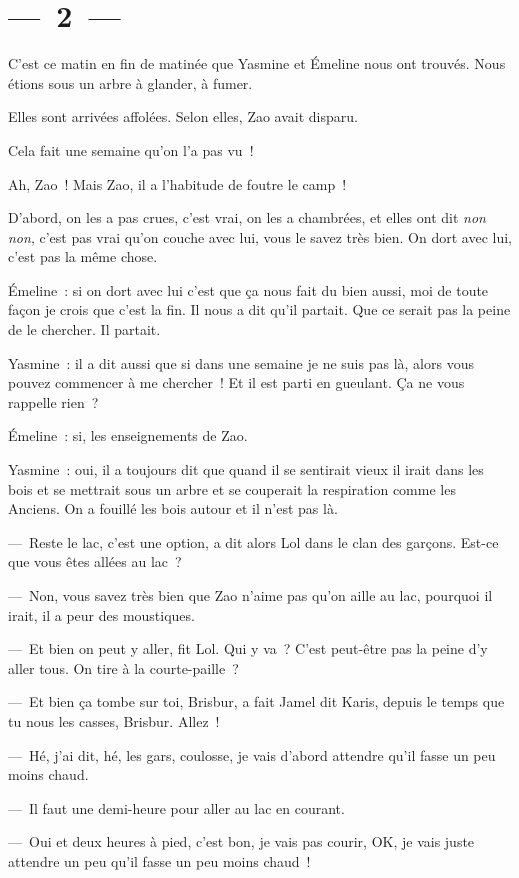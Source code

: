 \documentclass[french,twoside]{book} %
\begin{document}
\section[{— 2 —}]{— 2 —}
\renewcommand{\leftmark}{— 2 —}

\noindent C’est ce matin en fin de matinée que Yasmine et Émeline nous ont trouvés. Nous étions sous un arbre à glander, à fumer.\par
Elles sont arrivées affolées. Selon elles, Zao avait disparu.\par
Cela fait une semaine qu’on l’a pas vu !\par
Ah, Zao ! Mais Zao, il a l’habitude de foutre le camp !\par
D’abord, on les a pas crues, c’est vrai, on les a chambrées, et elles ont dit \emph{non non}, c’est pas vrai qu’on couche avec lui, vous le savez très bien. On dort avec lui, c’est pas la même chose.\par
Émeline : si on dort avec lui c’est que ça nous fait du bien aussi, moi de toute façon je crois que c’est la fin. Il nous a dit qu’il partait. Que ce serait pas la peine de le chercher. Il partait.\par
Yasmine : il a dit aussi que si dans une semaine je ne suis pas là, alors vous pouvez commencer à me chercher ! Et il est parti en gueulant. Ça ne vous rappelle rien ?\par
Émeline : si, les enseignements de Zao.\par
Yasmine : oui, il a toujours dit que quand il se sentirait vieux il irait dans les bois et se mettrait sous un arbre et se couperait la respiration comme les Anciens. On a fouillé les bois autour et il n’est pas là.\par
— Reste le lac, c’est une option, a dit alors Lol dans le clan des garçons. Est-ce que vous êtes allées au lac ?\par
— Non, vous savez très bien que Zao n’aime pas qu’on aille au lac, pourquoi il irait, il a peur des moustiques.\par
— Et bien on peut y aller, fit Lol. Qui y va ? C’est peut-être pas la peine d’y aller tous. On tire à la courte-paille ?\par
— Et bien ça tombe sur toi, Brisbur, a fait Jamel dit Karis, depuis le temps que tu nous les casses, Brisbur. Allez !\par
— Hé, j’ai dit, hé, les gars, coulosse, je vais d’abord attendre qu’il fasse un peu moins chaud.\par
— Il faut une demi-heure pour aller au lac en courant.\par
— Oui et deux heures à pied, c’est bon, je vais pas courir, OK, je vais juste attendre un peu qu’il fasse un peu moins chaud !
\end{document}
